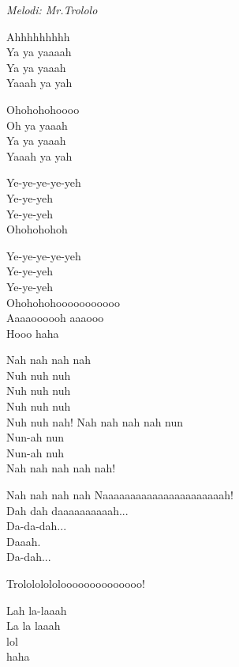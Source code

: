 {\footnotesize\textit{Melodi: Mr.Trololo}}\par
\vspace{10pt}
Ahhhhhhhhh\\
Ya ya yaaaah\\
Ya ya yaaah\\
Yaaah ya yah\par
\vspace{10pt}
Ohohohohoooo\\
Oh ya yaaah\\
Ya ya yaaah\\
Yaaah ya yah\par
\vspace{10pt}
Ye-ye-ye-ye-yeh\\
Ye-ye-yeh\\
Ye-ye-yeh\\
Ohohohohoh\par
\vspace{10pt}
Ye-ye-ye-ye-yeh\\
Ye-ye-yeh\\
Ye-ye-yeh\\
Ohohohohooooooooooo\\
Aaaaoooooh aaaooo\\
Hooo haha\par
\vspace{10pt}
Nah nah nah nah\\
Nuh nuh nuh\\
Nuh nuh nuh\\
Nuh nuh nuh\\
Nuh nuh nah!
\newpage
Nah nah nah nah nun\\
Nun-ah nun\\
Nun-ah nuh\\
Nah nah nah nah nah!\par
\vspace{10pt}
Nah nah nah nah Naaaaaaaaaaaaaaaaaaaaaah!\\
Dah dah daaaaaaaaaah...\\
Da-da-dah...\\
Daaah.\\
Da-dah...\par
\vspace{10pt}
Trolololololoooooooooooooo!\par
\vspace{10pt}
Lah la-laaah\\
La la laaah\\
lol\\
haha\par
\vspace{10pt}
